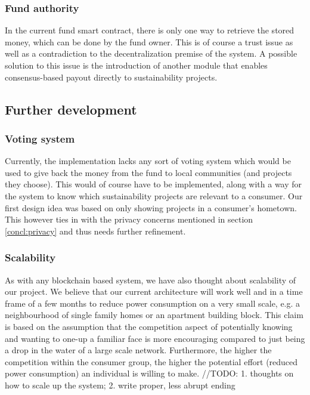 \documentclass[11pt]{article}
\begin{document}
\subsubsection{Fund authority}
In the current fund smart contract, there is only one way to retrieve the stored money, which can be done by the fund owner. This is of course a trust issue as well as a contradiction to the decentralization premise of the system. A possible solution to this issue is the introduction of another module that enables consensus-based payout directly to sustainability projects.
\subsection{Further development}
\subsubsection{Voting system}
Currently, the implementation lacks any sort of voting system which would be used to give back the money from the fund to local communities (and projects they choose). This would of course have to be implemented, along with a way for the system to know which sustainability projects are relevant to a consumer. Our first design idea was based on only showing projects in a consumer's hometown. This however ties in with the privacy concerns mentioned in section \ref{concl:privacy} and thus needs further refinement. 
\subsubsection{Scalability}
As with any blockchain based system, we have also thought about scalability of our project. We believe that our current architecture will work well and in a time frame of a few months to reduce power consumption on a very small scale, e.g. a neighbourhood of single family homes or an apartment building block. This claim is based on the assumption that the competition aspect of potentially knowing and wanting to one-up a familiar face is more encouraging compared to just being a drop in the water of a large scale network. Furthermore, the higher the competition within the consumer group, the higher the potential effort (reduced power consumption) an individual is willing to make.
\color{red} //TODO: 1. thoughts on how to scale up the system; 2. write proper, less abrupt ending \color{black}
\end{document}
